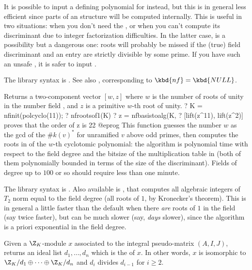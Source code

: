 It is possible to input a defining polynomial for 
instead, but this is in general less efficient since parts of an 
structure will be computed internally. This is useful in two situations: when
you don't need the , or when you can't compute its discriminant due
to integer factorization difficulties. In the latter case,  is
a possibility but a dangerous one: roots will probably be missed if the
(true) field discriminant and an  entry are strictly divisible
by some prime. If you have such an unsafe , it is safer to input
.

The library syntax is .
See also ,
corresponding to $\kbd{nf} = \kbd{NULL}$.

\label{se:nfrootsof1}
Returns a two-component vector $[w,z]$ where $w$ is the number of roots of
unity in the number field , and $z$ is a primitive $w$-th root
of unity.
\bprog
? K = nfinit(polcyclo(11));
? nfrootsof1(K)
? z = nfbasistoalg(K, %
? [lift(z^11), lift(z^2)]     \\ proves that the order of z is 22
@eprog
This function guesses the number $w$ as the gcd of the $\#k(v)^*$ for
unramified $v$ above odd primes, then computes the roots in 
of the $w$-th cyclotomic polynomial: the algorithm is polynomial time with
respect to the field degree and the bitsize of the multiplication table in
 (both of them polynomially bounded in terms of the size of the
discriminant). Fields of degree up to $100$ or so should require less than
one minute.

The library syntax is .
Also available is , that computes
all algebraic integers of $T_2$ norm equal to the field degree
(all roots of $1$, by Kronecker's theorem). This is in general a little
faster than the default when there \emph{are} roots of $1$ in the field
(say twice faster), but can be much slower (say, \emph{days} slower), since
the algorithm is a priori exponential in the field degree.

\label{se:nfsnf}
Given a $\Z_K$-module $x$ associated to the integral pseudo-matrix
$(A,I,J)$, returns an ideal list $d_1,\dots,d_n$ which is the  of $x$. In other words, $x$ is isomorphic to
$\Z_K/d_1\oplus\cdots\oplus\Z_K/d_n$ and $d_i$ divides $d_{i-1}$ for $i\ge2$.

